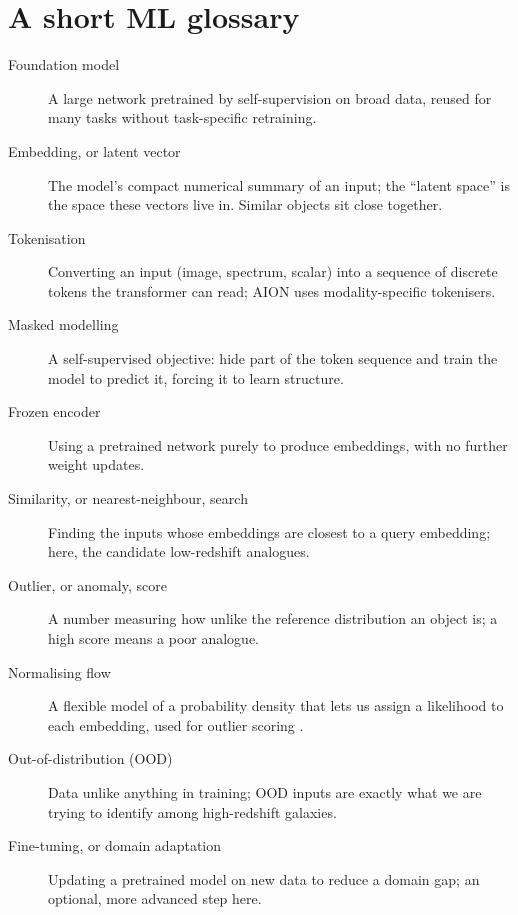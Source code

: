 \documentclass[onecolumn,astrosymb,tighten,longbib,trackchanges]{aastex7} %
\newcommand{\aion}{\textsc{AION}\xspace}
\begin{document}

{}

\clearpage
\appendix

\section{A short ML glossary} \label{appsec:glossary}

\begin{description}
  \item[Foundation model] A large network pretrained by self-supervision on broad data, reused for
        many tasks without task-specific retraining.
  \item[Embedding, or latent vector] The model's compact numerical summary of an input; the ``latent
        space'' is the space these vectors live in. Similar objects sit close together.
  \item[Tokenisation] Converting an input (image, spectrum, scalar) into a sequence of discrete
        tokens the transformer can read; \aion uses modality-specific tokenisers.
  \item[Masked modelling] A self-supervised objective: hide part of the token sequence and train the
        model to predict it, forcing it to learn structure.
  \item[Frozen encoder] Using a pretrained network purely to produce embeddings, with no further
        weight updates.
  \item[Similarity, or nearest-neighbour, search] Finding the inputs whose embeddings are closest to
        a query embedding; here, the candidate low-redshift analogues.
  \item[Outlier, or anomaly, score] A number measuring how unlike the reference distribution an
        object is; a high score means a poor analogue.
  \item[Normalising flow] A flexible model of a probability density that lets us assign a likelihood
        to each embedding, used for outlier scoring \citep{Liang2023_outlier_detection}.
  \item[Out-of-distribution (OOD)] Data unlike anything in training; OOD inputs are exactly what we
        are trying to identify among high-redshift galaxies.
  \item[Fine-tuning, or domain adaptation] Updating a pretrained model on new data to reduce a domain
        gap; an optional, more advanced step here.
\end{description}
\end{document}
